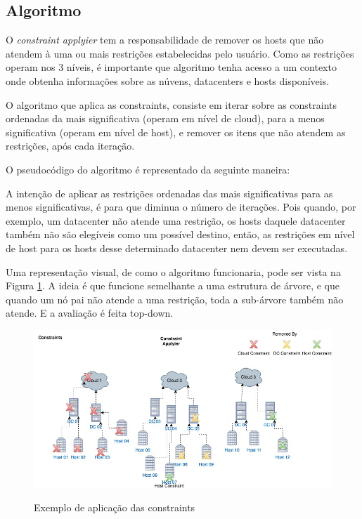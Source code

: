 \subsection{Algoritmo}
O \textit{constraint applyier} tem a responsabilidade de remover os hosts que não atendem à
uma ou mais restrições estabelecidas pelo usuário. Como as restrições operam nos 3 níveis,
é importante que algoritmo tenha acesso a um contexto onde obtenha informações sobre as núvens, 
datacenters e hosts disponíveis.

O algoritmo que aplica as constraints, consiste em iterar sobre as constraints ordenadas da mais significativa 
(operam em nível de cloud), para a menos significativa (operam em nível de host), e remover os itens que não atendem as
restrições, após cada iteração.

O pseudocódigo do algoritmo é representado da seguinte maneira:

\clearpage



A intenção de aplicar as restrições ordenadas das mais significativas
para as menos significativas, é para que diminua o número de iterações.
Pois quando, por exemplo, um datacenter não atende uma restrição, os hosts daquele datacenter 
também não são elegíveis como um possível destino, então, as restrições em nível de host para
os hosts desse determinado datacenter nem devem ser executadas. 

Uma representação visual, de como o algoritmo funcionaria, pode ser vista na Figura \ref{fig:constraintapplyier}. 
A ideia é que funcione semelhante a uma estrutura de árvore, e que quando um nó pai não atende a uma restrição, 
toda a sub-árvore também não atende. E a avaliação é feita top-down.

\begin{figure}[!htb]
  \centering
  \caption{Exemplo de aplicação das constraints}
  \includegraphics[width=1\textwidth]{./dados/figuras/constraintapplyier}
  \label{fig:constraintapplyier}
\end{figure}

